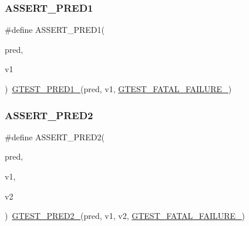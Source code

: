 \subsubsection{\texorpdfstring{ASSERT\_PRED1}{ASSERT\_PRED1}}
{\footnotesize\ttfamily \#define A\+S\+S\+E\+R\+T\+\_\+\+P\+R\+E\+D1(\begin{DoxyParamCaption}\item[{}]{pred,  }\item[{}]{v1 }\end{DoxyParamCaption})~\mbox{\hyperlink{_obj__test_2lib_2googletest-release-1_88_81_2googletest_2include_2gtest_2gtest__pred__impl_8h_ad44cf322952076d85305bbdf39769ac1}{G\+T\+E\+S\+T\+\_\+\+P\+R\+E\+D1\+\_\+}}(pred, v1, \mbox{\hyperlink{_obj__test_2lib_2googletest-release-1_88_81_2googletest_2include_2gtest_2internal_2gtest-internal_8h_a0f9a4c3ea82cc7bf4478eaffdc168358}{G\+T\+E\+S\+T\+\_\+\+F\+A\+T\+A\+L\+\_\+\+F\+A\+I\+L\+U\+R\+E\+\_\+}})}

\mbox{\label{_obj__test_2lib_2googletest-release-1_88_81_2googletest_2include_2gtest_2gtest__pred__impl_8h_a4e9b777cce4e5423f4c2e491be7aa818}} 
\subsubsection{\texorpdfstring{ASSERT\_PRED2}{ASSERT\_PRED2}}
{\footnotesize\ttfamily \#define A\+S\+S\+E\+R\+T\+\_\+\+P\+R\+E\+D2(\begin{DoxyParamCaption}\item[{}]{pred,  }\item[{}]{v1,  }\item[{}]{v2 }\end{DoxyParamCaption})~\mbox{\hyperlink{_obj__test_2lib_2googletest-release-1_88_81_2googletest_2include_2gtest_2gtest__pred__impl_8h_ac560264104bd030b64034505d294a7b6}{G\+T\+E\+S\+T\+\_\+\+P\+R\+E\+D2\+\_\+}}(pred, v1, v2, \mbox{\hyperlink{_obj__test_2lib_2googletest-release-1_88_81_2googletest_2include_2gtest_2internal_2gtest-internal_8h_a0f9a4c3ea82cc7bf4478eaffdc168358}{G\+T\+E\+S\+T\+\_\+\+F\+A\+T\+A\+L\+\_\+\+F\+A\+I\+L\+U\+R\+E\+\_\+}})}

\mbox{\label{_obj__test_2lib_2googletest-release-1_88_81_2googletest_2include_2gtest_2gtest__pred__impl_8h_aa7688f3ab9f09a2c1dbf13bd1f29d8fd}} 
